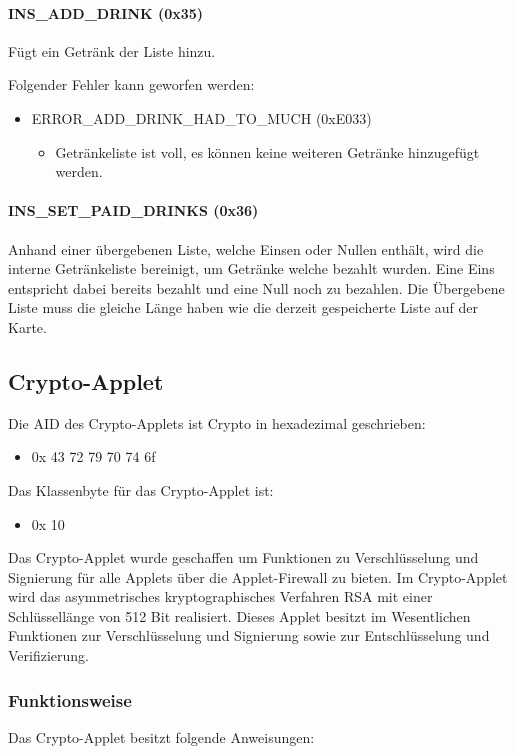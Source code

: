 \paragraph{INS\_ADD\_DRINK (0x35)}
Fügt ein Getränk der Liste hinzu.

Folgender Fehler kann geworfen werden:
\begin{itemize}
	\item ERROR\_ADD\_DRINK\_HAD\_TO\_MUCH (0xE033)
	\begin{itemize}
		\item Getränkeliste ist voll, es können keine weiteren Getränke hinzugefügt werden.
	\end{itemize}
\end{itemize}

\paragraph{INS\_SET\_PAID\_DRINKS (0x36)}
Anhand einer übergebenen Liste, welche Einsen oder Nullen enthält, wird die interne Getränkeliste bereinigt, um Getränke welche bezahlt wurden.
Eine Eins entspricht dabei bereits bezahlt und eine Null noch zu bezahlen.
Die Übergebene Liste muss die gleiche Länge haben wie die derzeit gespeicherte Liste auf der Karte.

\subsection{Crypto-Applet}
Die AID des Crypto-Applets ist Crypto in hexadezimal geschrieben:
\begin{itemize}
	\item 0x 43 72 79 70 74 6f
\end{itemize}
Das Klassenbyte für das Crypto-Applet ist:
\begin{itemize}
	\item 0x 10
\end{itemize}

Das Crypto-Applet wurde geschaffen um Funktionen zu Verschlüsselung und Signierung für alle Applets über die Applet-Firewall zu bieten.
Im Crypto-Applet wird das asymmetrisches kryptographisches Verfahren RSA mit einer Schlüssellänge von 512 Bit realisiert.
Dieses Applet besitzt im Wesentlichen Funktionen zur Verschlüsselung und Signierung sowie zur Entschlüsselung und Verifizierung.

\subsubsection{Funktionsweise}
Das Crypto-Applet besitzt folgende Anweisungen:
